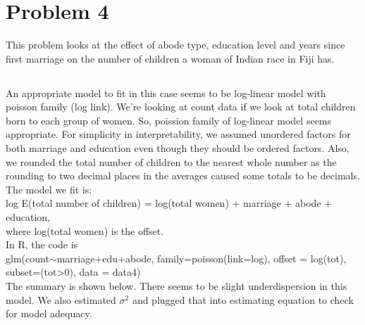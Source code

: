 \documentclass{article}
\begin{document}
\section{Problem 4}
This problem looks at the effect of abode type, education level and years since first marriage on the number of children a woman of Indian race in Fiji has.\\


\subsection{}
An appropriate model to fit in this case seems to be log-linear model with poisson family (log link). We're looking at count data if we look at total children born to each group of women. So, poission family of log-linear model seems appropriate. For simplicity in interpretability, we assumed unordered factors for both marriage and education even though they should be ordered factors. Also, we rounded the total number of children to the nearest whole number as the rounding to two decimal places in the averages caused some totals to be decimals. The model we fit is:\\
log E(total number of children) = log(total women) + marriage + abode + education,\\
where log(total women) is the offset.\\
In R, the code is\\
glm(count$\sim$marriage+edu+abode, family=poisson(link=log), 
           offset = log(tot), subset=(tot>0), data = data4)\\
The summary is shown below. There seems to be slight underdispersion in this model. We also estimated $\sigma^2$ and plugged that into estimating equation to check for model adequacy.\\           
\end{document}
